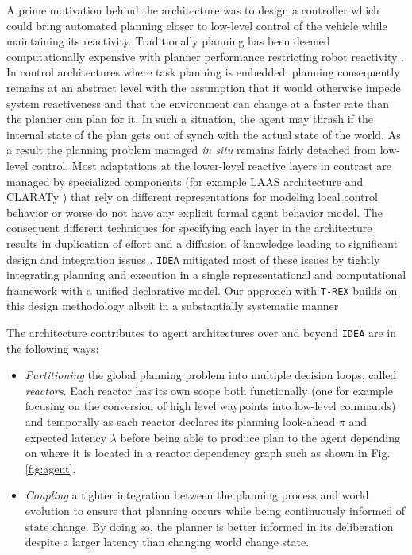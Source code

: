 A prime motivation behind the \rx architecture was to design a
controller which could bring automated planning closer to low-level
control of the vehicle while maintaining its reactivity. Traditionally
planning has been deemed computationally expensive with planner
performance restricting robot reactivity
\cite{ghallab04,Dias:2003ua}. In control architectures where task
planning is embedded, planning consequently remains at an abstract
level with the assumption that it would otherwise impede system
reactiveness and that the environment can change at a faster rate than
the planner can plan for it. In such a situation, the agent may thrash
if the internal state of the plan gets out of synch with the actual
state of the world. As a result the planning problem managed {\em in
  situ} remains fairly detached from low-level control. Most
adaptations at the lower-level reactive layers in contrast are managed
by specialized components (for example LAAS architecture
\cite{alami:1998p820,Ingrand07} and CLARATy \cite{Nesnas:2003do}
) that rely on different representations for modeling local
control behavior or worse do not have any explicit formal agent
behavior model. The consequent different techniques for specifying
each layer in the architecture results in duplication of effort and a
diffusion of knowledge leading to significant design and integration
issues \cite{DS1report}.  \texttt{IDEA} mitigated most of these issues
by tightly integrating planning and execution in a single
representational and computational framework with a unified
declarative model. Our approach with \texttt{T-REX} builds on this
design methodology albeit in a substantially systematic manner

The \rx architecture contributes to agent architectures over and
beyond \texttt{IDEA} are in the following ways:

\begin{itemize}

\item \emph{Partitioning} the global planning problem into multiple
  decision loops, called {\em reactors}. Each reactor has its own
  scope both functionally (one for example focusing on the conversion
  of high level waypoints into low-level commands) and temporally as
  each reactor declares its planning look-ahead $\pi$ and expected
  latency $\lambda$ before being able to produce plan to the agent
  depending on where it is located in a reactor dependency graph such
  as shown in Fig. \ref{fig:agent}.

\item \emph{Coupling} a tighter integration between the planning
  process and world evolution to ensure that planning occurs while
  being continuously informed of state change. By doing so, the
  planner is better informed in its deliberation despite a larger
  latency than changing world change state.

\end{itemize}

